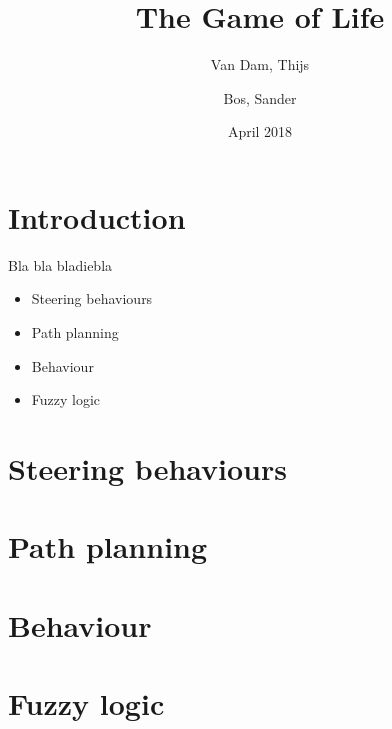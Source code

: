 \documentclass[11pt]{extarticle}
\author{Van Dam, Thijs\\
\and
Bos, Sander\\
}
\title{\huge The Game of Life}
\date{April 2018}
\begin{document}
    \maketitle
    \thispagestyle{empty}
    \newpage
    \newpage
    \setcounter{page}{1}
    \section{Introduction}\label{sec:introduction}
    Bla bla bladiebla
    \begin{itemize}
        \item Steering behaviours
        \item Path planning
        \item Behaviour
        \item Fuzzy logic
    \end{itemize}

    \newpage
    \tableofcontents
    \newpage
    \section{Steering behaviours}\label{sec:steering}
    

    \section{Path planning}\label{sec:pathPlanning}

    \newpage
    \section{Behaviour}\label{sec:behaviour}

    \newpage
    \section{Fuzzy logic}\label{sec:fuzzyLogic}
    
\end{document}

